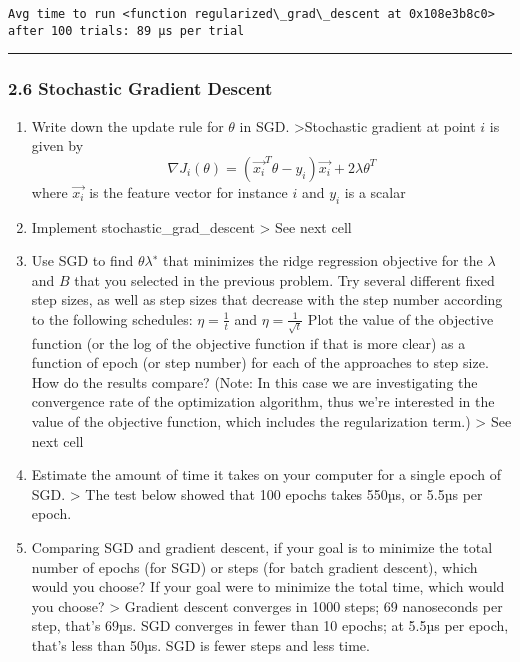 \documentclass{article}
\begin{document}
    \begin{Verbatim}[commandchars=\\\{\}]
Avg time to run <function regularized\_grad\_descent at 0x108e3b8c0> after 100 trials: 89 µs per trial
    \end{Verbatim}

    \begin{center}\rule{0.5\linewidth}{\linethickness}\end{center}

\subsubsection{2.6 Stochastic Gradient
Descent}\label{stochastic-gradient-descent}

\begin{enumerate}
\def\labelenumi{\arabic{enumi}.}
\item
  Write down the update rule for \(\theta\) in SGD.
  \textgreater{}Stochastic gradient at point \(i\) is given by
  \[\nabla J_i(\theta) = (\vec{x_i}^T\theta - y_i)\vec{x_i} + 2\lambda \theta^T\]
  where \(\vec{x_i}\) is the feature vector for instance \(i\) and
  \(y_i\) is a scalar
\item
  Implement stochastic\_grad\_descent \textgreater{} See next cell
\item
  Use SGD to find \(θλ^∗\) that minimizes the ridge regression objective
  for the \(λ\) and \(B\) that you selected in the previous problem. Try
  several different fixed step sizes, as well as step sizes that
  decrease with the step number according to the following schedules:
  \(η = \frac{1}{t}\) and \(η = \frac{1}{\sqrt{t}}\) Plot the value of
  the objective function (or the log of the objective function if that
  is more clear) as a function of epoch (or step number) for each of the
  approaches to step size. How do the results compare? (Note: In this
  case we are investigating the convergence rate of the optimization
  algorithm, thus we're interested in the value of the objective
  function, which includes the regularization term.) \textgreater{} See
  next cell
\item
  Estimate the amount of time it takes on your computer for a single
  epoch of SGD. \textgreater{} The test below showed that 100 epochs
  takes 550µs, or 5.5µs per epoch.
\item
  Comparing SGD and gradient descent, if your goal is to minimize the
  total number of epochs (for SGD) or steps (for batch gradient
  descent), which would you choose? If your goal were to minimize the
  total time, which would you choose? \textgreater{} Gradient descent
  converges in 1000 steps; 69 nanoseconds per step, that's 69µs. SGD
  converges in fewer than 10 epochs; at 5.5µs per epoch, that's less
  than 50µs. SGD is fewer steps and less time.
\end{enumerate}
\end{document}
